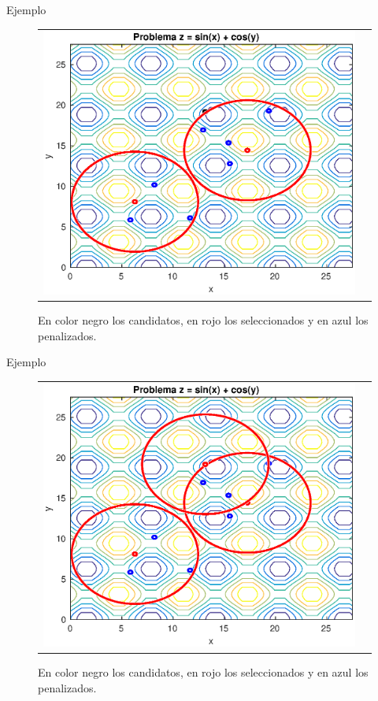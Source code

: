 \documentclass{beamer}
\begin{document}
\begin{frame}{Ejemplo}
\begin{figure}[H]
  \centering
  \begin{tabular}{c c}
   \includegraphics[scale=0.6]{3.eps} 
  \end{tabular}
  \caption{\scriptsize En color negro los candidatos, en rojo los seleccionados y en azul los penalizados.}
\end{figure}
\end{frame}

\begin{frame}{Ejemplo}
\begin{figure}[H]
  \centering
  \begin{tabular}{c c}
   \includegraphics[scale=0.6]{4.eps} 
  \end{tabular}
  \caption{\scriptsize En color negro los candidatos, en rojo los seleccionados y en azul los penalizados.}
\end{figure}
\end{frame}
\end{document}
